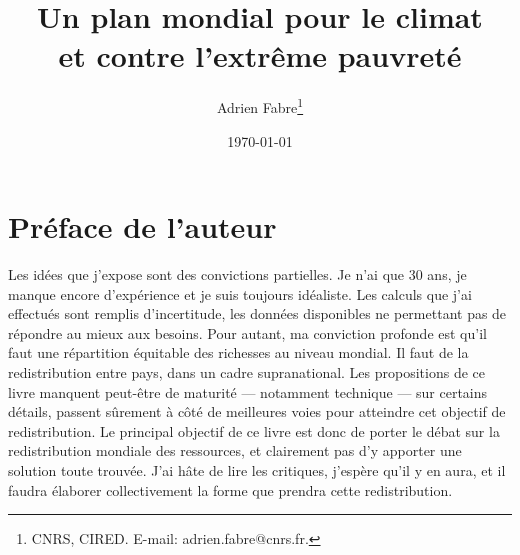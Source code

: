 \documentclass[a5paper,french]{memoir}
\title{Un plan mondial pour le climat \\et contre l'extrême pauvreté}
\author{Adrien Fabre\footnote{CNRS, CIRED. E-mail: adrien.fabre@cnrs.fr.}}
\date{\today}
\begin{document}
\maketitle

\clearpage
\tableofcontents

\chapter*{Préface de l'auteur\label{ch:preface}}

Les idées que j'expose sont des convictions partielles. Je n'ai que 30 ans, je manque encore d'expérience et je suis toujours idéaliste. Les calculs que j'ai effectués sont remplis d'incertitude, les données disponibles ne permettant pas de répondre au mieux aux besoins. Pour autant, ma conviction profonde est qu'il faut une répartition équitable des richesses au niveau mondial. Il faut de la redistribution entre pays, dans un cadre supranational. Les propositions de ce livre manquent peut-être de maturité --- notamment technique --- sur certains détails, passent sûrement à côté de meilleures voies pour atteindre cet objectif de redistribution. Le principal objectif de ce livre est donc de porter le débat sur la redistribution mondiale des ressources, et clairement pas d'y apporter une solution toute trouvée. J'ai hâte de lire les critiques, j'espère qu'il y en aura, et il faudra élaborer collectivement la forme que prendra cette redistribution. 
\end{document}
